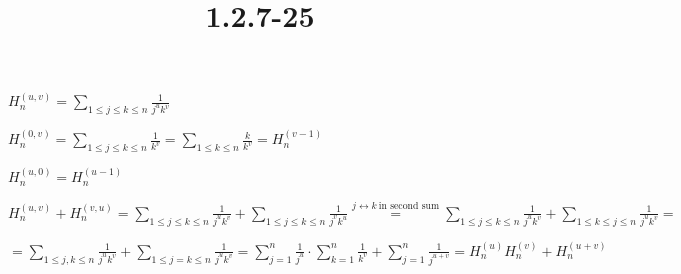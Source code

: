 \documentclass{article}
\title{1.2.7-25}
\begin{document}
\maketitle

$H_n^{(u,v)} = \sum_{1 \leq j \leq k \leq n} \frac{1}{j^uk^v}$

$H_n^{(0,v)} = \sum_{1 \leq j \leq k \leq n} \frac{1}{k^v} = \sum_{1 \leq k \leq n} \frac{k}{k^v} = H_n^{(v-1)}$

$H_n^{(u,0)} = H_n^{(u-1)}$

$H_n^{(u,v)} + H_n^{(v,u)} = \sum_{1 \leq j \leq k \leq n} \frac{1}{j^uk^v} + \sum_{1 \leq j \leq k \leq n} \frac{1}{j^vk^u} \overset{j \leftrightarrow k\ \textrm{in second sum}}{=} \sum_{1 \leq j \leq k \leq n} \frac{1}{j^uk^v} + \sum_{1 \leq k \leq j \leq n} \frac{1}{j^uk^v} =$

$= \sum_{1 \leq j, k \leq n} \frac{1}{j^uk^v} + \sum_{1 \leq j=k \leq n} \frac{1}{j^uk^v} = \sum_{j=1}^n \frac{1}{j^u} \cdot \sum_{k=1}^n \frac{1}{k^v} + \sum_{j=1}^n \frac{1}{j^{u+v}} = H_n^{(u)} H_n^{(v)} + H_n^{(u+v)}$
\end{document}
